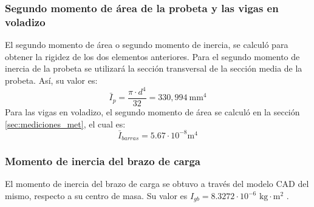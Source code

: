 \subsubsection{Segundo momento de área de la probeta y las vigas en voladizo}
El segundo momento de área o segundo momento de inercia, se calculó para obtener la rigidez de los dos elementos anteriores. Para el segundo momento de inercia de la probeta se utilizará la sección transversal de la sección media de la probeta. Así, su valor es:
\begin{equation}
	\bar{I}_p = \frac{\pi \cdot d^4}{32} = 330,994\: \text{mm}^4
\end{equation}
Para las vigas en voladizo, el segundo momento de área se calculó en la sección \ref{sec:mediciones_met}, el cual es:
\begin{equation}
	\bar{I}_{barras} = 5.67 \cdot 10^{-8} \text{m}^4
\end{equation}
\subsubsection{Momento de inercia del brazo de carga}
El momento de inercia del brazo de carga se obtuvo a través del modelo CAD del mismo, respecto a su centro de masa. Su valor es $I_{gb} = 8.3272\cdot 10^{-6} \text{ kg}\cdot \text{m}^2$ . 

